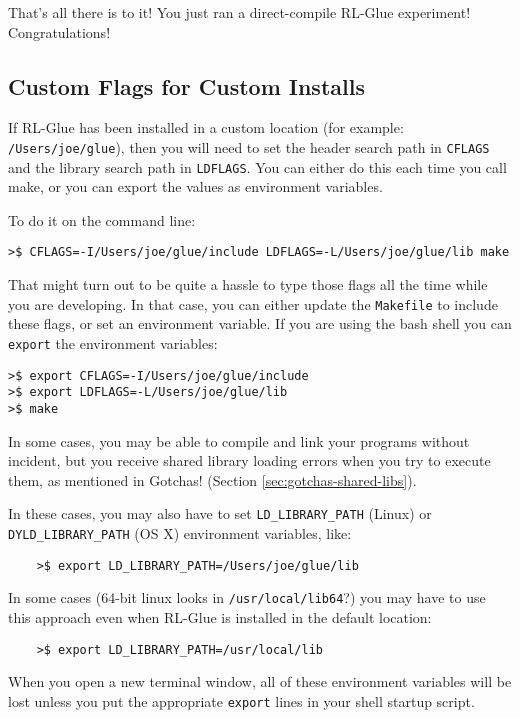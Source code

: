 \documentclass[11pt]{article}
\begin{document}
That's all there is to it! You just ran a direct-compile RL-Glue experiment! Congratulations!

\subsection{Custom Flags for Custom Installs}
\label{sec:custom-flags}
If RL-Glue has been installed in a custom location (for example: \texttt{/Users/joe/glue}), then you will
need to set the header search path in \texttt{CFLAGS} and the library search path in \texttt{LDFLAGS}.  You can either do this each time you call make, 
or you can export the values as environment variables.

To do it on the command line:
\begin{verbatim}
>$ CFLAGS=-I/Users/joe/glue/include LDFLAGS=-L/Users/joe/glue/lib make
\end{verbatim}

That might turn out to be quite a hassle to type those flags all the time while you are developing.  In that case, you can either update the \texttt{Makefile} to include these flags, 
or set an environment variable.  If you are using the bash shell you can \texttt{export} the environment variables:
\begin{verbatim}
>$ export CFLAGS=-I/Users/joe/glue/include
>$ export LDFLAGS=-L/Users/joe/glue/lib
>$ make
\end{verbatim}

In some cases, you may be able to compile and link your programs without incident, but you receive shared library loading errors when you try to execute them, as mentioned in Gotchas! (Section \ref{sec:gotchas-shared-libs}).

In these cases, you may also have to set \texttt{LD\_LIBRARY\_PATH} (Linux) or \texttt{DYLD\_LIBRARY\_PATH} (OS X) environment variables, like:
\begin{verbatim}
	>$ export LD_LIBRARY_PATH=/Users/joe/glue/lib
\end{verbatim}

In some cases (64-bit linux looks in \texttt{/usr/local/lib64}?) you may have to use this approach even when RL-Glue is installed in the default location:
\begin{verbatim}
	>$ export LD_LIBRARY_PATH=/usr/local/lib
\end{verbatim}

When you open a new terminal window, all of these environment variables will be lost unless you put the appropriate \texttt{export} lines in your shell startup script.
\end{document}
